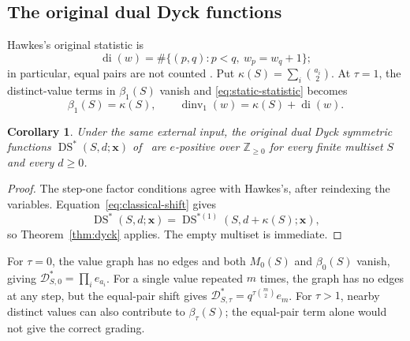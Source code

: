 \documentclass[11pt]{article}
\newtheorem{corollary}[theorem]{Corollary}
\theoremstyle{remark}
\newcommand{\NN}{\mathbb Z_{\geq 0}}
\newcommand{\xx}{\mathbf x}
\DeclareMathOperator{\di}{di}
\DeclareMathOperator{\dinv}{dinv}
\DeclareMathOperator{\DS}{DS}
\numberwithin{equation}{section}
\begin{document}
\subsection{The original dual Dyck functions}
Hawkes's original statistic is
\[
 \di(w)=\#\{(p,q):p<q,\ w_p=w_q+1\};
\]
in particular, equal pairs are not counted
\cite[Definition~2.1]{Hawkes}. Put $\kappa(S)=\sum_i\binom{a_i}{2}$.
At $\tau=1$, the distinct-value terms in $\beta_1(S)$ vanish and
\eqref{eq:static-statistic} becomes
\begin{equation}\label{eq:classical-shift}
 \beta_1(S)=\kappa(S),\qquad
 \dinv_1(w)=\kappa(S)+\di(w).
\end{equation}

\begin{corollary}\label{cor:classical}
Under the same external input, the original dual Dyck symmetric functions
$\DS^*(S,d;\xx)$ of~\cite[Definition~2.5]{Hawkes} are $e$-positive
over $\NN$ for every finite multiset $S$ and every $d\geq0$.
\end{corollary}
\begin{proof}
The step-one factor conditions agree with Hawkes's, after reindexing
the variables. Equation~\eqref{eq:classical-shift} gives
\[
 \DS^*(S,d;\xx)=\DS^{*(1)}(S,d+\kappa(S);\xx),
\]
so Theorem~\ref{thm:dyck} applies. The empty multiset is immediate.
\end{proof}

For $\tau=0$, the value graph has no edges and both $M_0(S)$ and
$\beta_0(S)$ vanish, giving $\mathcal D^*_{S,0}=\prod_i e_{a_i}$.
For a single value repeated $m$ times, the graph has no edges at any
step, but the equal-pair shift gives
$\mathcal D^*_{S,\tau}=q^{\tau\binom m2}e_m$.
For $\tau>1$, nearby distinct values can also contribute to
$\beta_\tau(S)$; the equal-pair term alone would not give the correct
grading.
\end{document}
